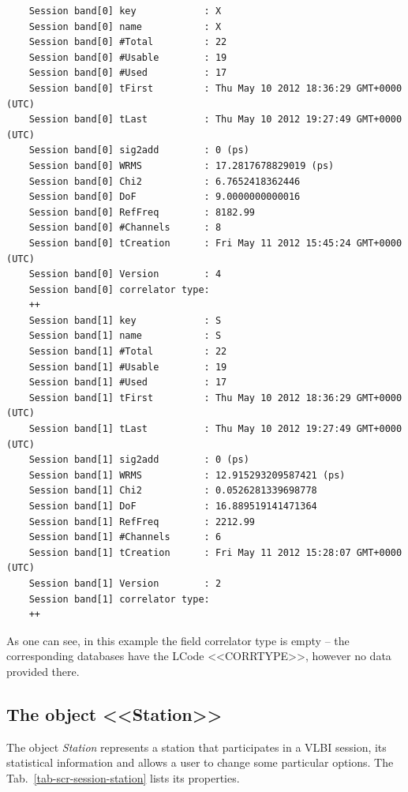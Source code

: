 \documentclass [10pt,letterpaper]{report}
\begin{document}
{\small\begin{verbatim}
    Session band[0] key            : X
    Session band[0] name           : X
    Session band[0] #Total         : 22
    Session band[0] #Usable        : 19
    Session band[0] #Used          : 17
    Session band[0] tFirst         : Thu May 10 2012 18:36:29 GMT+0000 (UTC)
    Session band[0] tLast          : Thu May 10 2012 19:27:49 GMT+0000 (UTC)
    Session band[0] sig2add        : 0 (ps)
    Session band[0] WRMS           : 17.2817678829019 (ps)
    Session band[0] Chi2           : 6.7652418362446
    Session band[0] DoF            : 9.0000000000016
    Session band[0] RefFreq        : 8182.99
    Session band[0] #Channels      : 8
    Session band[0] tCreation      : Fri May 11 2012 15:45:24 GMT+0000 (UTC)
    Session band[0] Version        : 4
    Session band[0] correlator type: 
    ++
    Session band[1] key            : S
    Session band[1] name           : S
    Session band[1] #Total         : 22
    Session band[1] #Usable        : 19
    Session band[1] #Used          : 17
    Session band[1] tFirst         : Thu May 10 2012 18:36:29 GMT+0000 (UTC)
    Session band[1] tLast          : Thu May 10 2012 19:27:49 GMT+0000 (UTC)
    Session band[1] sig2add        : 0 (ps)
    Session band[1] WRMS           : 12.915293209587421 (ps)
    Session band[1] Chi2           : 0.0526281339698778
    Session band[1] DoF            : 16.889519141471364
    Session band[1] RefFreq        : 2212.99
    Session band[1] #Channels      : 6
    Session band[1] tCreation      : Fri May 11 2012 15:28:07 GMT+0000 (UTC)
    Session band[1] Version        : 2
    Session band[1] correlator type: 
    ++
\end{verbatim}}
\noindent
As one can see, in this example the field correlator type is empty --  the corresponding
databases have the LCode <<CORRTYPE>>, however no data provided there.



\subsection{The object <<Station>>}
\label{section-scripting-session-station}

The object {\sl Station} represents a station that participates in a VLBI session,
its statistical information and allows a user to change some particular options.
The Tab.~\ref{tab-scr-session-station} lists its properties.
\end{document}
